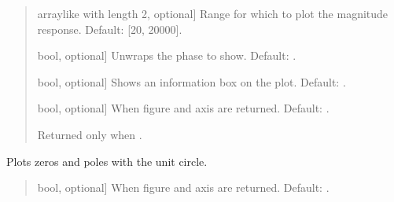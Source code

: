 \documentclass[letterpaper,10pt,english]{sphinxmanual}
\begin{document}
\begin{fulllineitems}
\begin{fulllineitems}
\begin{quote}
\begin{description}
\begin{description}
\sphinxlineitem{\sphinxstylestrong{range\_hz}}{[}array\sphinxhyphen{}like with length 2, optional{]}
\sphinxAtStartPar
Range for which to plot the magnitude response.
Default: {[}20, 20000{]}.

\sphinxlineitem{\sphinxstylestrong{unwrap}}{[}bool, optional{]}
\sphinxAtStartPar
Unwraps the phase to show. Default: .

\sphinxlineitem{\sphinxstylestrong{show\_info\_box}}{[}bool, optional{]}
\sphinxAtStartPar
Shows an information box on the plot. Default: .

\sphinxlineitem{\sphinxstylestrong{returns}}{[}bool, optional{]}
\sphinxAtStartPar
When  figure and axis are returned. Default: .

\end{description}

\begin{description}
\sphinxAtStartPar
Returned only when .

\end{description}

\end{description}\end{quote}

\end{fulllineitems}


\begin{fulllineitems}
\label{\detokenize{classes:dsptools.classes.filter_class.Filter.plot_zp}}
\pysigstartsignatures
{}
\pysigstopsignatures
\sphinxAtStartPar
Plots zeros and poles with the unit circle.
\begin{quote}\begin{description}
\begin{description}
\sphinxlineitem{\sphinxstylestrong{returns}}{[}bool, optional{]}
\sphinxAtStartPar
When  figure and axis are returned. Default: .


\end{description}
\end{description}
\end{quote}
\end{fulllineitems}
\end{fulllineitems}
\end{document}
